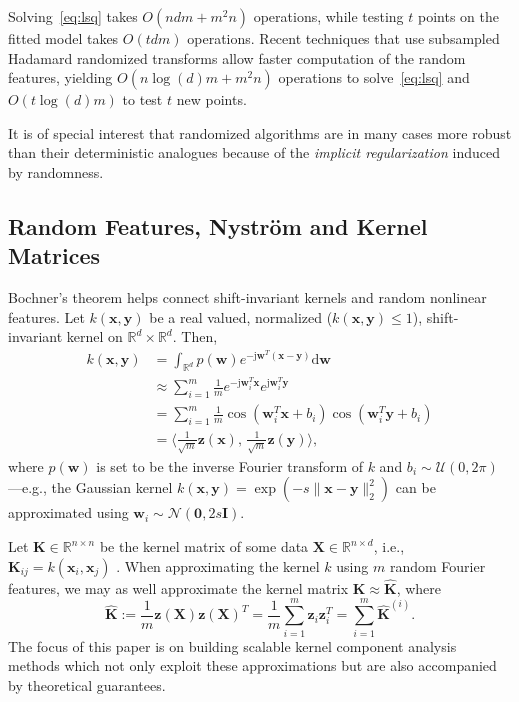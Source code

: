 \documentclass{article}
\newcommand{\reals}{\mathbb{R}}
\newcommand{\ip}[2]{\langle {#1},\, {#2} \rangle}
\begin{document}
  Solving~\eqref{eq:lsq} takes $O(ndm+m^2n)$ operations, while testing $t$
  points on the fitted model takes $O(tdm)$ operations.  Recent techniques that
  use subsampled Hadamard randomized transforms \citep{Le13} allow faster
  computation of the random features, yielding $O(n\log(d)m+m^2n)$ operations
  to solve~\eqref{eq:lsq} and $O(t\log(d)m)$ to test $t$ new points.

  It is of special interest that randomized algorithms are in many cases more
  robust than their deterministic analogues \citep{Mahoney11} because of the
  \emph{implicit regularization} induced by randomness.

  \subsection{Random Features, Nystr\"om and Kernel Matrices}\label{sec:bochner}
  Bochner's theorem helps connect shift-invariant kernels \citep{Scholkopf01}
  and random nonlinear features. Let $k(\bm x,\bm y)$ be a real
  valued, normalized ($k(\bm x, \bm y) \leq 1$), shift-invariant kernel on
  $\reals^d \times \reals^d$.  Then, 
  \begin{align*}
    k(\bm x, \bm y) &= \int_{\reals^d} p(\bm w) e^{-\mathrm{j}\bm w^T(\bm x-\bm
    y)}\mathrm{d}\bm w\\
                     &\approx \sum\nolimits_{i=1}^m \tfrac{1}{m}
                     e^{-\mathrm{j}\bm w_i^T\bm x}e^{\mathrm{j}\bm w_i^T\bm
                     y}\\
                     &= \sum\nolimits_{i=1}^m \tfrac{1}{m} \cos(\bm w_i^T\bm
                     x+ b_i)\cos (\bm w_i^T\bm y+ b_i)\\\
                     &= \ip{\tfrac{1}{\sqrt{m}}\bm z(\bm
                     x)}{\tfrac{1}{\sqrt{m}}\bm z(\bm y)},
  \end{align*}
  where $p(\bm w)$ is set to be the inverse Fourier transform of $k$ and $b_i
  \sim \mathcal{U}(0,2\pi)$ \citep{Rahimi08}---e.g., the Gaussian kernel $k(\bm
  x,\bm y)=\exp(-s\|\bm x-\bm y\|_2^2)$ can be approximated  using $\bm w_i
  \sim \mathcal{N}(\bm 0, 2s\bm I)$.

  Let $\bm K \in \mathbb{R}^{n\times n}$ be the kernel matrix of some data $\bm
  X \in \mathbb{R}^{n\times d}$, i.e., $\bm K_{ij} = k(\bm x_i, \bm x_j)$ .
  When approximating the kernel $k$ using $m$ random Fourier features, we may
  as well approximate the kernel matrix $\bm K \approx
  \hat{\bm K}$, where
  \begin{equation}\label{eq:kmats}
    \hat{\bm K} := \frac{1}{m}\bm z(\bm X)\bm z(\bm X)^T =
    \frac{1}{m} \sum_{i=1}^m \bm z_i\bm z_i^T = \sum_{i=1}^m \bm \hat{\bm
    K}^{(i)}.
  \end{equation}
  The focus of this paper is on building scalable kernel component analysis
  methods which not only exploit these approximations but are also accompanied
  by theoretical guarantees.
\end{document}
